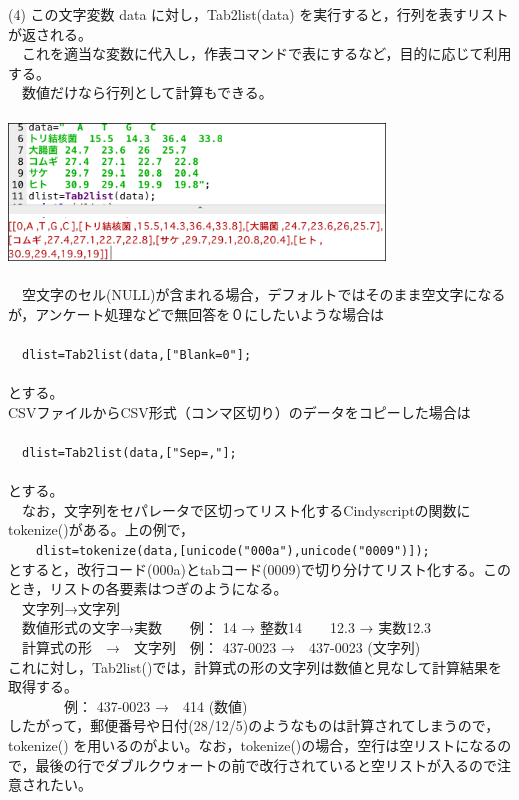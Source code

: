 \documentclass[papersize,a4paper,12pt,uplatex]{jsarticle}
\begin{document}
\begin{description}
(4) この文字変数 data に対し，Tab2list(data) を実行すると，行列を表すリストが返される。\\
　これを適当な変数に代入し，作表コマンドで表にするなど，目的に応じて利用する。\\
　数値だけなら行列として計算もできる。\\
　\\ 
\includegraphics[bb=0 0 1245 457 , width=10cm]{Fig/tab2list03.png}\\
　\\
　空文字のセル(NULL)が含まれる場合，デフォルトではそのまま空文字になるが，アンケート処理などで無回答を０にしたいような場合は\\
　\\
　\verb|dlist=Tab2list(data,["Blank=0"];|\\
　\\
 とする。\\
 
 CSVファイルからCSV形式（コンマ区切り）のデータをコピーした場合は\\
　\\
　\verb|dlist=Tab2list(data,["Sep=,"];|\\
　\\ 
 とする。\\
 
 　なお，文字列をセパレータで区切ってリスト化するCindyscriptの関数に tokenize()がある。上の例で，\\
 　　\verb|dlist=tokenize(data,[unicode("000a"),unicode("0009")]);|\\
 とすると，改行コード(000a)とtabコード(0009)で切り分けてリスト化する。このとき，リストの各要素はつぎのようになる。\\
　文字列→文字列\\
　数値形式の文字→実数　　例： 14 → 整数14　　12.3 → 実数12.3\\
　計算式の形　→　文字列　例： 437-0023 →　437-0023 (文字列)\\
これに対し，Tab2list()では，計算式の形の文字列は数値と見なして計算結果を取得する。\\
　　　　例： 437-0023 →　414 (数値)\\
したがって，郵便番号や日付(28/12/5)のようなものは計算されてしまうので，tokenize() を用いるのがよい。なお，tokenize()の場合，空行は空リストになるので，最後の行でダブルクウォートの前で改行されていると空リストが入るので注意されたい。\\



\end{description}
\end{document}
